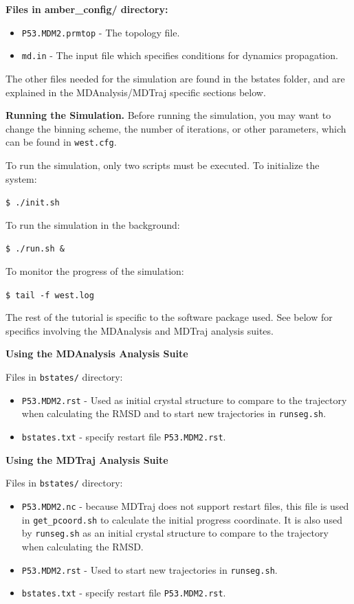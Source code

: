 \documentclass[9pt,tutorial]{livecoms}
\begin{document}
\textbf{Files in amber\_config/ directory:}
\begin{itemize} 
\item \verb|P53.MDM2.prmtop| - The topology file.
\item \verb|md.in| - The input file which specifies conditions for dynamics propagation.
\end{itemize}

The other files needed for the simulation are found in the bstates folder, and are explained in the MDAnalysis/MDTraj specific sections below.

\textbf{Running the Simulation.} Before running the simulation, you may want to change the binning scheme, the number of iterations, or other parameters, which can be found in \verb|west.cfg|.

To run the simulation, only two scripts must be executed. To initialize the system:

\verb|$ ./init.sh|

To run the simulation in the background:

\verb|$ ./run.sh &|

To monitor the progress of the simulation:

\verb|$ tail -f west.log|

The rest of the tutorial is specific to the software package used. 
See below for specifics involving the MDAnalysis and MDTraj analysis suites.

\textbf{Using the MDAnalysis Analysis Suite}

Files in \verb|bstates/| directory:
\begin{itemize}
\item \verb|P53.MDM2.rst| - Used as initial crystal structure to compare to the trajectory when calculating the RMSD and to start new trajectories in \verb|runseg.sh|.
\item \verb|bstates.txt| - specify restart file \verb|P53.MDM2.rst|.
\end{itemize}

\textbf{Using the MDTraj Analysis Suite}

Files in \verb|bstates/| directory:
\begin{itemize}
\item \verb|P53.MDM2.nc| - because MDTraj does not support restart files, this file is used in \verb|get_pcoord.sh| to calculate the initial progress coordinate. 
It is also used by \verb|runseg.sh| as an initial crystal structure to compare to the trajectory when calculating the RMSD.
\item \verb|P53.MDM2.rst| - Used to start new trajectories in \verb|runseg.sh|.
\item \verb|bstates.txt| - specify restart file \verb|P53.MDM2.rst|.
\end{itemize}
\end{document}
